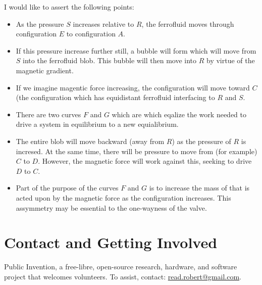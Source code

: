 \documentclass{article}
\begin{document}
I would like to assert the following points:
\begin{itemize}
\item As the pressure $S$ increases relative to $R$, the ferrofluid moves through configuration $E$ to configuration $A$.
  \item If this pressure increase further still, a bubble will form which will move from $S$ into the ferrofluid blob.
    This bubble will then move into $R$ by virtue of the magnetic gradient.
  \item If we imagine magentic force increasing, the configuration will move toward $C$ (the configuration which has
    equidistant ferrofluid interfacing to $R$ and $S$.
  \item There are two curves $F$ and $G$ which are which eqalize the work needed to drive a system in equilibrium to
    a new equialibrium.
  \item The entire blob will move backward (away from $R$) as the pressure of $R$ is incresed.  At the same time,
    there will be pressure to move from (for example) $C$ to $D$.  However, the magnetic force will work against
    this, seeking to drive $D$ to $C$.
  \item Part of the purpose of the curves $F$ and $G$ is to increase the mass of that is acted upon by the magnetic
    force as the configuration increases. This assymmetry may be essential to the one-wayness of the valve.
  \end{itemize}

\section{Contact and Getting Involved}

Public Invention,
a free-libre, open-source research, hardware, and software project that welcomes volunteers.
To assist, contact:
\href{mailto:read.robert@gmail.com}{read.robert@gmail.com}.



\end{document}
